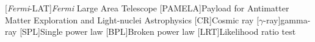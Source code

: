 \begin{acronym}[TDMA]

[\textit{Fermi}-LAT]{\textit{Fermi} Large Area Telescope}
[PAMELA]{Payload for Antimatter Matter Exploration and Light-nuclei Astrophysics}
[CR]{Cosmic ray}
[$\gamma$-ray]{gamma-ray}
[SPL]{Single power law}
[BPL]{Broken power law}
[LRT]{Likelihood ratio test}

\end{acronym}